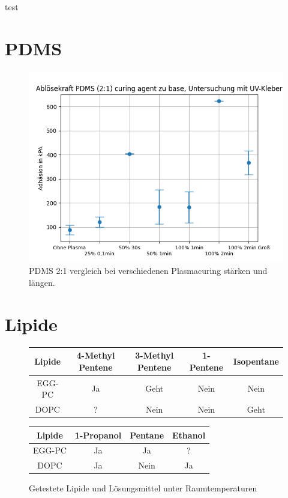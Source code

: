 test

\section{PDMS}

	\begin{figure}[h]
		\includegraphics[width=14cm]{test}
		\caption{PDMS 2:1 vergleich bei verschiedenen Plasmacuring stärken und längen.}
	\end{figure}

\section{Lipide}


\begin{figure}[h]
	\begin{tabular}{|c|c|c|c|c|}
		\hline
		Lipide & 4-Methyl Pentene & 3-Methyl Pentene & 1-Pentene & Isopentane \\
		\hline
		EGG-PC & Ja & Geht & Nein & Nein \\
		\hline
		DOPC & ? & Nein & Nein & Geht \\
		\hline
	\end{tabular}
	\begin{tabular}{|c|c|c|c|}
		\hline
		Lipide &  1-Propanol & Pentane & Ethanol \\
		\hline
		EGG-PC & Ja & Ja & ? \\
		\hline
		DOPC & Ja & Nein & Ja \\
		\hline
	\end{tabular}
	\caption{Getestete Lipide und Lösungsmittel unter Raumtemperaturen}
\end{figure}
	

